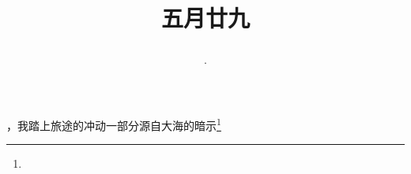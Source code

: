 \title{\date[d=4,m=7,y=2024][year:cn-y,年,month:cn,day:cn,日,·,weekday]·五月廿九 }
，我踏上旅途的冲动一部分源自大海的暗示\footnote{ }

